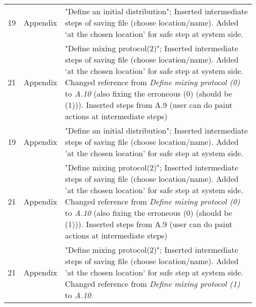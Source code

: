 \begin{longtable}{|l|l|p{11cm}|}
    19 & Appendix & "Define an initial distribution"; Inserted intermediate steps of saving file (choose location/name). Added `at the chosen location' for safe step at system side.\\
    21 & Appendix & "Define mixing protocol(2)"; Inserted intermediate steps of saving file (choose location/name). Added `at the chosen location' for safe step at system side. Changed reference from \emph{Define mixing protocol (0)} to \emph{A.10} (also fixing the erroneous (0) (should be (1))). Inserted steps from A.9 (user can do paint actions at intermediate steps) \\
    19 & Appendix & "Define an initial distribution"; Inserted intermediate steps of saving file (choose location/name). Added 'at the chosen location' for safe step at system side.\\
    21 & Appendix & "Define mixing protocol(2)"; Inserted intermediate steps of saving file (choose location/name). Added 'at the chosen location' for safe step at system side. Changed reference from \emph{Define mixing protocol (0)} to \emph{A.10} (also fixing the erroneous (0) (should be (1))). Inserted steps from A.9 (user can do paint actions at intermediate steps) \\
    21 & Appendix & "Define mixing protocol(2)"; Inserted intermediate steps of saving file (choose location/name). Added 'at the chosen location' for safe step at system side. Changed reference from \emph{Define mixing protocol (1)} to \emph{A.10}.\\


\end{longtable}

